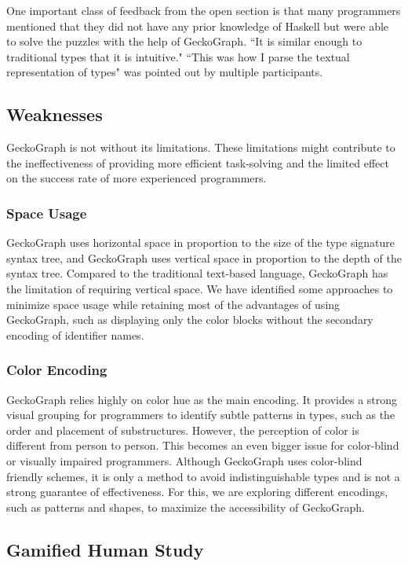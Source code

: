 One important class of feedback from the open section is that many programmers mentioned that they did not have any prior knowledge of Haskell but were able to solve the puzzles with the help of GeckoGraph.
``It is similar enough to traditional types that it is intuitive." ``This was how I parse the textual representation of types" was pointed out by multiple participants.

\subsection{Weaknesses}
GeckoGraph is not without its limitations. These limitations might contribute to the ineffectiveness of providing more efficient task-solving and the limited effect on the success rate of more experienced programmers. 

\subsubsection{Space Usage}\label{subsec:space}
GeckoGraph uses horizontal space in proportion to the size of the type signature syntax tree, and GeckoGraph uses vertical space in proportion to the depth of the syntax tree. Compared to the traditional text-based language, GeckoGraph has the limitation of requiring vertical space. We have identified some approaches to minimize space usage while retaining most of the advantages of using GeckoGraph, such as displaying only the color blocks without the secondary encoding of identifier names.


\subsubsection{Color Encoding}
GeckoGraph relies highly on color hue as the main encoding. It provides a strong visual grouping  \cite{Zeng2023-jz}  for programmers to identify subtle patterns in types, such as the order and placement of substructures. However, the perception of color is different from person to person. This becomes an even bigger issue for color-blind or visually impaired programmers. Although GeckoGraph uses color-blind friendly schemes, it is only a method to avoid indistinguishable types and is not a strong guarantee of effectiveness. For this, we are exploring different encodings, such as patterns and shapes, to maximize the accessibility of GeckoGraph. 


\subsection{Gamified Human Study}

